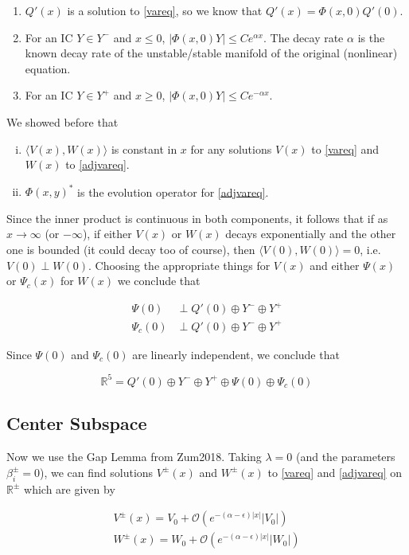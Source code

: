 \documentclass[12pt]{article}
\def\R{{\mathbb R}}
\begin{document}
\begin{enumerate}
	\item $Q'(x)$ is a solution to \eqref{vareq}, so we know that $Q'(x) = \Phi(x, 0)Q'(0)$.
	\item For an IC $Y \in Y^-$ and $x \leq 0$, $|\Phi(x, 0) Y| \leq C e^{\alpha x}$. The decay rate $\alpha$ is the known decay rate of the unstable/stable manifold of the original (nonlinear) equation.
	\item For an IC $Y \in Y^+$ and $x \geq 0$, $|\Phi(x, 0) Y| \leq C e^{-\alpha x}$. 
\end{enumerate}

We showed before that

\begin{enumerate}[(i)]
\item $\langle V(x), W(x) \rangle$ is constant in $x$ for any solutions $V(x)$ to \eqref{vareq} and $W(x)$ to \eqref{adjvareq}.
\item $\Phi(x, y)^*$ is the evolution operator for \eqref{adjvareq}.
\end{enumerate}

Since the inner product is continuous in both components, it follows that if as $x \rightarrow \infty$ (or $-\infty$), if either $V(x)$ or $W(x)$ decays exponentially and the other one is bounded (it could decay too of course), then $\langle V(0), W(0) \rangle = 0$, i.e. $V(0) \perp W(0)$. Choosing the appropriate things for $V(x)$ and either $\Psi(x)$ or $\Psi_c(x)$ for $W(x)$ we conclude that

\begin{align*}
\Psi(0) &\perp Q'(0) \oplus Y^- \oplus Y^+ \\
\Psi_c(0) &\perp Q'(0) \oplus Y^- \oplus Y^+
\end{align*}

Since $\Psi(0)$ and $\Psi_c(0)$ are linearly independent, we conclude that 

\[
\R^5 = Q'(0) \oplus Y^- \oplus Y^+ \oplus \Psi(0) \oplus \Psi_c(0) 
\]

\subsection*{Center Subspace}

Now we use the Gap Lemma from Zum2018. Taking $\lambda = 0$ (and the parameters $\beta_i^\pm = 0$), we can find solutions $V^\pm(x)$ and $W^\pm(x)$ to \eqref{vareq} and \eqref{adjvareq} on $\R^\pm$ which are given by

\begin{align*}
V^\pm(x) = V_0 + \mathcal{O}(e^{-(\alpha - \epsilon)|x|}|V_0|) \\
W^\pm(x) = W_0 + \mathcal{O}(e^{-(\alpha - \epsilon)|x|}|W_0|)
\end{align*}
\end{document}
